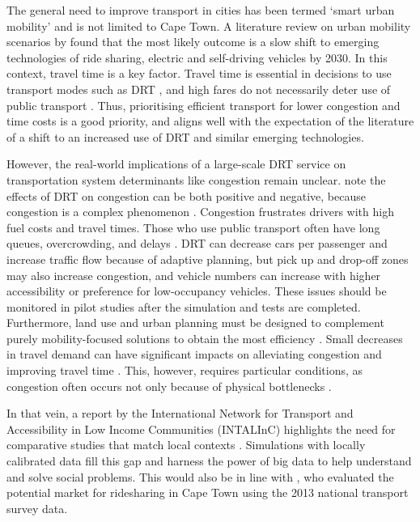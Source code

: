 \documentclass[preprint,12pt,authoryear]{elsarticle}
\newcommand{\absatz}{\par\hspace*{1.5em}\ignorespaces}
\begin{document}
\absatz
The general need to improve transport in cities has been termed ‘smart urban mobility’\citep{butler2020smart} and is not limited to Cape Town.
A literature review on urban mobility scenarios by \citet{miskolczi2021urban} found that the most likely outcome is a slow shift to emerging technologies of ride sharing, electric and self-driving vehicles by 2030.
In this context, travel time is a key factor.
Travel time is essential in decisions to use transport modes such as DRT \citep{reck2020shared}, and high fares do not necessarily deter use of public transport \citep{tyrinopoulos2013factors}.
Thus, prioritising efficient transport for lower congestion and time costs is a good priority, and aligns well with the expectation of the literature of a shift to an increased use of DRT and similar emerging technologies.
\absatz
However, the real-world implications of a large-scale DRT service on transportation system determinants like congestion remain unclear.
\citet{butler2020smart} note the effects of DRT on congestion can be both positive and negative, because congestion is a complex phenomenon \citep{arnott1994economics}.
Congestion frustrates drivers with high fuel costs and travel times.
Those who use public transport often have long queues, overcrowding, and delays \citep{jennings2015finding}.
DRT can decrease cars per passenger and increase traffic flow because of adaptive planning, but pick up and drop-off zones may also increase congestion, and vehicle numbers can increase with higher accessibility or preference for low-occupancy vehicles.
These issues should be monitored in pilot studies after the simulation and tests are completed.
Furthermore, land use and urban planning must be designed to complement purely mobility-focused solutions to obtain the most efficiency \citep{jabbarpour2018applications}.
Small decreases in travel demand can have significant impacts on alleviating congestion and improving travel time \citep{vickrey1969congestion}.
This, however, requires particular conditions, as congestion often occurs not only because of physical bottlenecks \citep{arnott1994economics}.
\absatz
In that vein, a report by the International Network for Transport and Accessibility in Low Income Communities (INTALInC) highlights the need for comparative studies that match local contexts \citep{lucas2019transport}.
Simulations with locally calibrated data fill this gap and harness the power of big data to help understand and solve social problems.
This would also be in line with \citet{vanderschuren2018ride}, who evaluated the potential market for ridesharing in Cape Town using the 2013 national transport survey data.
\end{document}
